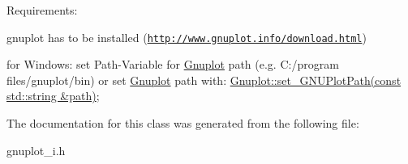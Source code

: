 Requirements\-:
\begin{DoxyItemize}
\item gnuplot has to be installed (\href{http://www.gnuplot.info/download.html}{\tt http\-://www.\-gnuplot.\-info/download.\-html})
\item for Windows\-: set Path-\/\-Variable for \hyperlink{class_gnuplot}{Gnuplot} path (e.\-g. C\-:/program files/gnuplot/bin) or set \hyperlink{class_gnuplot}{Gnuplot} path with\-: \hyperlink{class_gnuplot_a67cae885c26ced821e335d98986f1967}{Gnuplot\-::set\-\_\-\-G\-N\-U\-Plot\-Path(const std\-::string \&path)}; 
\end{DoxyItemize}

The documentation for this class was generated from the following file\-:\begin{DoxyCompactItemize}
\item 
gnuplot\-\_\-i.\-h\end{DoxyCompactItemize}
